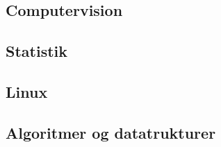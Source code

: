 \documentclass[a4paper,11pt]{article}
\begin{document}
\subsection{Computervision}
\subsection{Statistik}
\subsection{Linux}
\subsection{Algoritmer og datatrukturer}
\end{document}
